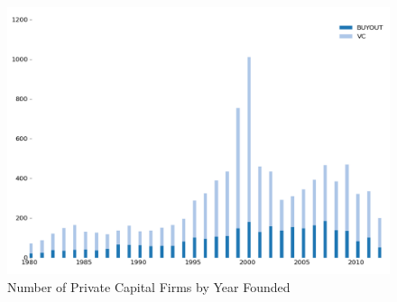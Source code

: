 
\begin{figure}[hbt]
    \centering
        \includegraphics[width=\widthpcriaa]{./assets/pcri/pcrifigurea1} 
        \caption{Number of Private Capital Firms by Year Founded}\label{fig:pcrifigurea1}
\end{figure}